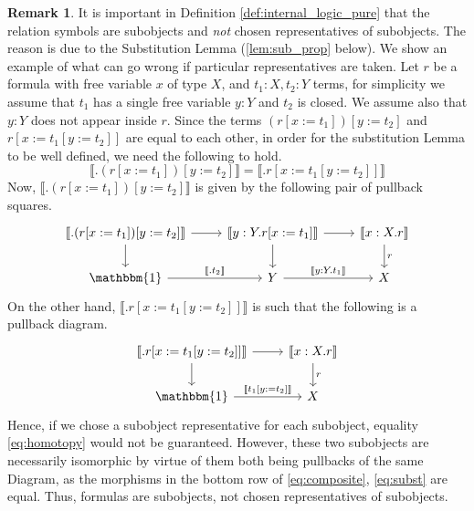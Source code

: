 \documentclass{birkjour}
\theoremstyle{plain}
\theoremstyle{definition}
\newtheorem{remark}[thm]{Remark}
\begin{document}
	\begin{remark}
		It is important in Definition \ref{def:internal_logic_pure} that the relation symbols are subobjects and \emph{not} chosen representatives of subobjects. The reason is due to the Substitution Lemma (\ref{lem:sub_prop} below). We show an example of what can go wrong if particular representatives are taken. Let $r$ be a formula with free variable $x$ of type $X$, and $t_1:X,t_2:Y$ terms, for simplicity we assume that $t_1$ has a single free variable $y:Y$ and $t_2$ is closed. We assume also that $y:Y$ does not appear inside $r$. Since the terms $(r[x:= t_1])[y := t_2]$ and $r[x := t_1[y := t_2]]$ are equal to each other, in order for the substitution Lemma to be well defined, we need the following to hold.
		\begin{equation}\label{eq:homotopy}
			\llbracket . (r[x:= t_1])[y := t_2] \rrbracket = \llbracket .  r[x := t_1[y := t_2]]\rrbracket
		\end{equation}
		Now, $\llbracket. (r[x:= t_1])[y := t_2] \rrbracket$ is given by the following pair of pullback squares.
		\begin{equation}\label{eq:composite}
			\begin{tikzcd}
				\llbracket . (r[x:= t_1])[y := t_2] \rrbracket\arrow[d]\arrow[r] &  \llbracket y: Y. r[x := t_1] \rrbracket\arrow[d]\arrow[r] & \llbracket x:X. r \rrbracket\arrow[d,"r"]\\
				\mathbbm{1}\arrow[r,"{\llbracket . t_2 \rrbracket}"] & Y\arrow[r,"{\llbracket y:Y. t_1\rrbracket}"] & X
			\end{tikzcd}
		\end{equation}
		On the other hand, $\llbracket .r [x:= t_1[y:= t_2]]\rrbracket$ is such that the following is a pullback diagram.
		\begin{equation}\label{eq:subst}
			\begin{tikzcd}
				\llbracket . r[x := t_1[y := t_2]]\rrbracket\arrow[d]\arrow[r] & \llbracket x:X. r\rrbracket\arrow[d,"{r}"]\\
				\mathbbm{1}\arrow[r,"{\llbracket t_1[y := t_2]\rrbracket}"] & X
			\end{tikzcd}
		\end{equation}
		Hence, if we chose a subobject representative for each subobject, equality \eqref{eq:homotopy} would not be guaranteed. However, these two subobjects are necessarily isomorphic by virtue of them both being pullbacks of the same Diagram, as the morphisms in the bottom row of \eqref{eq:composite}, \eqref{eq:subst} are equal. Thus, formulas are subobjects, not chosen representatives of subobjects.
	\end{remark}
	
\end{document}
